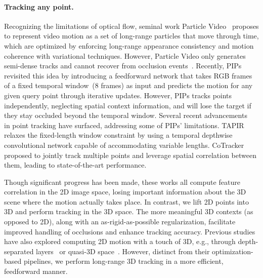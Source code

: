 \paragraph{Tracking any point.} Recognizing the limitations of optical flow, seminal work Particle Video~\cite{PartVid} proposes to represent video motion as a set of long-range particles that move through time, which are optimized by enforcing long-range appearance consistency and motion coherence with variational techniques. However, Particle Video only generates semi-dense tracks and cannot recover from occlusion events~\cite{rubinstein2012towards}. Recently, PIPs~\cite{pips} revisited this idea by introducing a feedforward network that takes RGB frames of a fixed temporal window~(8 frames) as input and predicts the motion for any given query point through iterative updates. However, PIPs tracks points independently, neglecting spatial context information, and will lose the target if they stay occluded beyond the temporal window.
Several recent advancements~\cite{neoral2023mft,tap-vid,Tapir,wang2023tracking,bian2023context,zheng2023pointodyssey} in point tracking have surfaced, addressing some of PIPs' limitations.
TAPIR~\cite{Tapir} relaxes the fixed-length window constraint by using a temporal depthwise convolutional network capable of accommodating variable lengths. CoTracker~\cite{cotracker} proposed to jointly track multiple points and leverage spatial correlation between them, leading to state-of-the-art performance.

Though significant progress has been made, these works all compute feature correlation in the 2D image space, losing important information about the 3D scene where the motion actually takes place. In contrast, we lift 2D points into 3D and perform tracking in the 3D space. The more meaningful 3D contexts (as opposed to 2D), along with an as-rigid-as-possible regularization, facilitate improved handling of occlusions and enhance tracking accuracy. Previous studies have also explored computing 2D motion with a touch of 3D, e.g., through depth-separated layers~\cite{kasten2021layered,ye2022deformable,sun2010layered,sevilla2016optical} or quasi-3D space~\cite{wang2023tracking}. However, distinct from their optimization-based pipelines, we perform long-range 3D tracking in a more efficient, feedforward manner. 

\vspace{-0.5em}
